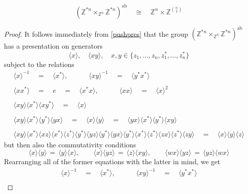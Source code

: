 \documentclass{amsbook} %
\numberwithin{section}{chapter}
\begin{document}
\begin{prop} \label{abst}
\[ (\mathbb{Z}^{\ast n} \times_{\mathbb{Z}^n} \mathbb{Z}^{\ast n})^{\mathrm{ab}} \quad \cong \quad \mathbb{Z}^n \times {\mathbb{Z}}^{{n}\choose{2}} \]
\end{prop}
\begin{proof}
It follows immediately from \cref{pushpres} that the group $(\mathbb{Z}^{\ast n} \times_{\mathbb{Z}^n} \mathbb{Z}^{\ast n})^{\mathrm{ab}}$ has a presentation on generators
\[ \langle x \rangle, \quad \langle xy \rangle, \quad x,y \in \{z_1, \ldots, z_n, z_1^*, \ldots, z_n^*\} \]
subject to the relations
\[ \begin{array}{c}
			\langle x \rangle^{-1} \quad = \quad \langle x^* \rangle, \quad \quad \quad \langle xy \rangle^{-1} \quad = \quad \langle y^*x^* \rangle \\
			\\
			\langle xx^* \rangle \quad = \quad e \quad = \quad \langle x^*x \rangle, \quad \quad \quad \langle xx \rangle \quad = \quad \langle x \rangle^2 \\
			\\
			\langle xy \rangle \langle x^* \rangle \langle xy^* \rangle \quad = \quad \langle x \rangle  \\
			\\
			\langle xy \rangle \langle x^* \rangle \langle y^* \rangle \langle yx \rangle \quad = \quad \langle x \rangle \langle y \rangle  \quad = \quad \langle yx \rangle \langle x^* \rangle \langle y^* \rangle \langle xy \rangle \\
			\\
			\langle xy \rangle \langle x^* \rangle \langle xz \rangle \langle x^* \rangle \langle z^* \rangle \langle y^* \rangle \langle yz \rangle \langle y^* \rangle \langle yx \rangle \langle y^* \rangle \langle x^* \rangle \langle z^* \rangle \langle zx \rangle \langle z^* \rangle \langle zy \rangle \quad = \quad \langle x \rangle\langle y \rangle\langle z \rangle 
		\end{array}
\]
but then also the commutativity conditions
\[ \langle x \rangle \langle y \rangle \, = \, \langle y \rangle \langle x \rangle, \quad \quad \langle x \rangle \langle yz \rangle \, = \, \langle z \rangle \langle xy \rangle, \quad \quad	\langle wx \rangle \langle yz \rangle \, = \, \langle yz \rangle \langle wx \rangle \] 
Rearranging all of the former equations with the latter in mind, we get
\[ \begin{array}{c}
			\langle x \rangle^{-1} \quad = \quad \langle x^* \rangle, \quad \quad \quad \langle xy \rangle^{-1} \quad = \quad \langle y^*x^* \rangle \\

\end{array}\]
\end{proof}
\end{document}
